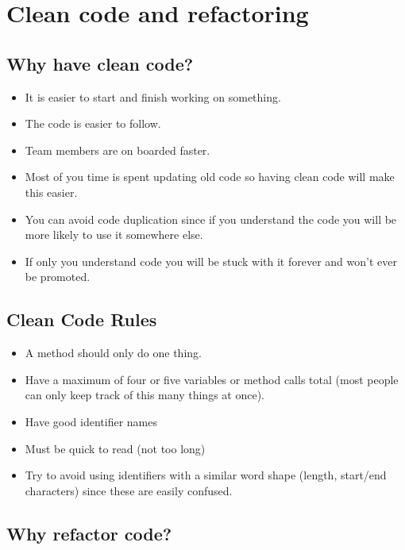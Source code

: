 \section{Clean code and refactoring}\label{sec:clean_code_and_refactoring}

\subsection{Why have clean code?}\label{sub:why_have_clean_code_}

\begin{itemize}
	\item It is easier to start and finish working on something.
	\item The code is easier to follow.
	\item Team members are on boarded faster.
	\item Most of you time is spent updating old code so having clean code will make this easier.
	\item You can avoid code duplication since if you understand the code you will be more likely to use it somewhere else.
	\item If only you understand code you will be stuck with it forever and won't ever be promoted.
\end{itemize}

\subsection{Clean Code Rules}\label{sub:clean_code_rules}

\begin{itemize}
	\item A method should only do one thing.
	\item Have a maximum of four or five variables or method calls total (most people can only keep track of this many things at once).
	\item Have good identifier names
	\item Must be quick to read (not too long)
	\item Try to avoid using identifiers with a similar word shape (length, start/end characters) since these are easily confused.
\end{itemize}

\subsection{Why refactor code?}\label{sub:why_refactor_code_}

